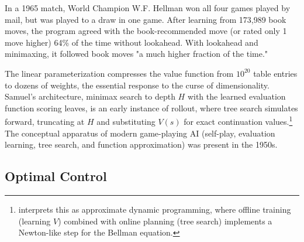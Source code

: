 In a 1965 match, World Champion W.F. Hellman won all four games played by mail, but was played to a draw in one game. After learning from 173,989 book moves, the program agreed with the book-recommended move (or rated only 1 move higher) 64\% of the time without lookahead. With lookahead and minimaxing, it followed book moves "a much higher fraction of the time."

The linear parameterization compresses the value function from $10^{20}$ table entries to dozens of weights, the essential response to the curse of dimensionality. Samuel's architecture, minimax search to depth $H$ with the learned evaluation function scoring leaves, is an early instance of rollout, where tree search simulates forward, truncating at $H$ and substituting $V(s)$ for exact continuation values.\footnote{\citet{bertsekas2021lessons} interprets this as approximate dynamic programming, where offline training (learning $V$) combined with online planning (tree search) implements a Newton-like step for the Bellman equation.} The conceptual apparatus of modern game-playing AI (self-play, evaluation learning, tree search, and function approximation) was present in the 1950s.

\subsection{Optimal Control}

